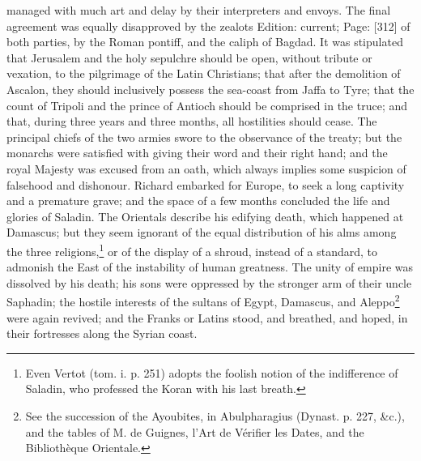 managed with much art and delay by their interpreters and envoys. The final agreement was equally disapproved by the zealots Edition: current; Page: [312] of both parties, by the Roman pontiff, and the caliph of Bagdad. It was stipulated that Jerusalem and the holy sepulchre should be open, without tribute or vexation, to the pilgrimage of the Latin Christians; that after the demolition of Ascalon, they should inclusively possess the sea-coast from Jaffa to Tyre; that the count of Tripoli and the prince of Antioch should be comprised in the truce; and that, during three years and three months, all hostilities should cease. The principal chiefs of the two armies swore to the observance of the treaty; but the monarchs were satisfied with giving their word and their right hand; and the royal Majesty was excused from an oath, which always implies some suspicion of falsehood and dishonour. Richard embarked for Europe, to seek a long captivity and a premature grave; and the space of a few months concluded the life and glories of Saladin. The Orientals describe his edifying death, which happened at Damascus; but they seem ignorant of the equal distribution of his alms among the three religions,\footnote{Even Vertot (tom. i. p. 251) adopts the foolish notion of the indifference of Saladin, who professed the Koran with his last breath.} or of the display of a shroud, instead of a standard, to admonish the East of the instability of human greatness. The unity of empire was dissolved by his death; his sons were oppressed by the stronger arm of their uncle Saphadin; the hostile interests of the sultans of Egypt, Damascus, and Aleppo\footnote{See the succession of the Ayoubites, in Abulpharagius (Dynast. p. 227, \&c.), and the tables of M. de Guignes, l\texthebrew{}’Art de Vérifier les Dates, and the Bibliothèque Orientale.} were again revived; and the Franks or Latins stood, and breathed, and hoped, in their fortresses along the Syrian coast.

